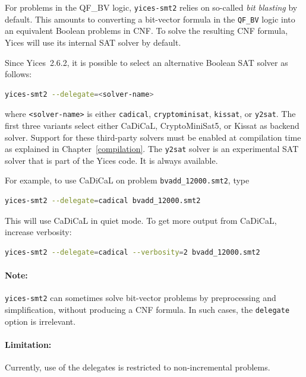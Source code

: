 \documentclass[11pt,twoside,fleqn,openright,titlepage]{cslreport}
\begin{document}
For problems in the QF\_BV logic, \texttt{yices-smt2} relies on
so-called \emph{bit blasting} by default. This amounts to
converting a bit-vector formula in the \texttt{QF\_BV} logic into an
equivalent Boolean problems in CNF. To solve the resulting CNF
formula, Yices will use its internal SAT solver by default.

\medskip\noindent
Since
Yices~2.6.2, it is possible to select an alternative Boolean SAT solver as follows:
\begin{small}
\begin{lstlisting}[language=sh]
   yices-smt2 --delegate=<solver-name>
\end{lstlisting}
\end{small}
where \texttt{<solver-name>} is either \texttt{cadical},
\texttt{cryptominisat}, \texttt{kissat}, or \texttt{y2sat}.  The first three variants
select either CaDiCaL, CryptoMiniSat5, or Kissat as backend solver. Support for these
third-party solvers must be enabled at compilation time as
explained in Chapter~\ref{compilation}. The \texttt{y2sat} solver is
an experimental SAT solver that is part of the Yices code. It is
always available.

\medskip\noindent
For example, to use CaDiCaL on problem \texttt{bvadd\_12000.smt2}, type
\begin{small}
\begin{lstlisting}[language=sh]
   yices-smt2 --delegate=cadical bvadd_12000.smt2
\end{lstlisting}
\end{small}
This will use CaDiCaL in quiet mode. To get more output from CaDiCaL, increase verbosity:
\begin{small}
\begin{lstlisting}[language=sh]
   yices-smt2 --delegate=cadical --verbosity=2 bvadd_12000.smt2
\end{lstlisting}
\end{small}

\paragraph{Note:} \texttt{yices-smt2} can sometimes solve bit-vector
problems by preprocessing and simplification, without producing a CNF
formula. In such cases, the \texttt{delegate} option is irrelevant.

\paragraph{Limitation:} Currently, use of the delegates is restricted to non-incremental problems.
\end{document}
